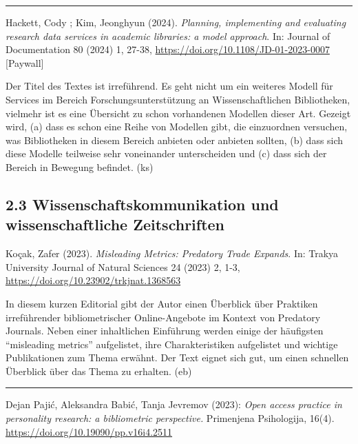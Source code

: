 \documentclass[a4paper,
fontsize=11pt,
oneside,
numbers=noperiodatend,
parskip=half-,
bibliography=totoc,
final
]{scrartcl}
\begin{document}
\begin{center}\rule{0.5\linewidth}{0.5pt}\end{center}

Hackett, Cody ; Kim, Jeonghyun (2024). \emph{Planning, implementing and
evaluating research data services in academic libraries: a model
approach}. In: Journal of Documentation 80 (2024) 1, 27-38,
\url{https://doi.org/10.1108/JD-01-2023-0007} {[}Paywall{]}

Der Titel des Textes ist irreführend. Es geht nicht um ein weiteres
Modell für Services im Bereich Forschungsunterstützung an
Wissenschaftlichen Bibliotheken, vielmehr ist es eine Übersicht zu schon
vorhandenen Modellen dieser Art. Gezeigt wird, (a) dass es schon eine
Reihe von Modellen gibt, die einzuordnen versuchen, was Bibliotheken in
diesem Bereich anbieten oder anbieten sollten, (b) dass sich diese
Modelle teilweise sehr voneinander unterscheiden und (c) dass sich der
Bereich in Bewegung befindet. (ks)

\hypertarget{wissenschaftskommunikation-und-wissenschaftliche-zeitschriften}{%
\subsection{2.3 Wissenschaftskommunikation und wissenschaftliche
Zeitschriften}\label{wissenschaftskommunikation-und-wissenschaftliche-zeitschriften}}

Koçak, Zafer (2023). \emph{Misleading Metrics: Predatory Trade Expands}.
In: Trakya University Journal of Natural Sciences 24 (2023) 2, 1-3,
\url{https://doi.org/10.23902/trkjnat.1368563}

In diesem kurzen Editorial gibt der Autor einen Überblick über Praktiken
irreführender bibliometrischer Online-Angebote im Kontext von Predatory
Journals. Neben einer inhaltlichen Einführung werden einige der
häufigsten \enquote{misleading metrics} aufgelistet, ihre
Charakteristiken aufgelistet und wichtige Publikationen zum Thema
erwähnt. Der Text eignet sich gut, um einen schnellen Überblick über das
Thema zu erhalten. (eb)

\begin{center}\rule{0.5\linewidth}{0.5pt}\end{center}

Dejan Pajić, Aleksandra Babić, Tanja Jevremov (2023): \emph{Open access
practice in personality research: a bibliometric perspective.}
Primenjena Psihologija, 16(4).
\url{https://doi.org/10.19090/pp.v16i4.2511}
\end{document}
